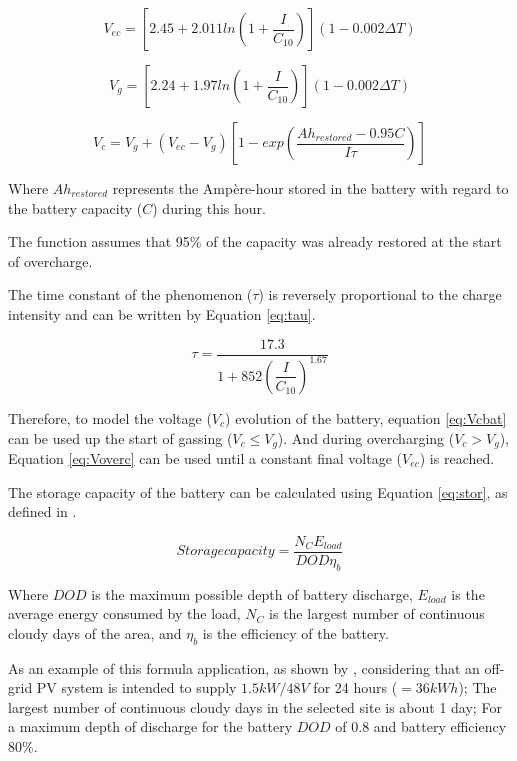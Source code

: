 \begin{equation}
\label{eq:Vec}
V_{ec} = \left[ 2.45 + 2.011 ln \left( 1+\dfrac{I}{C_{10}} \right)  \right] (1-0.002 \Delta T)
\end{equation}

\begin{equation}
\label{eq:Vg}
V_{g} = \left[ 2.24 + 1.97 ln \left( 1+\dfrac{I}{C_{10}} \right)  \right] (1-0.002 \Delta T)
\end{equation}

\begin{equation}
\label{eq:Voverc}
V_{c} = V_{g} + (V_{ec} - V_{g}) \left[ 1- exp \left( \dfrac{Ah_{restored}-0.95C}{I\tau}  \right)    \right] 
\end{equation}

Where $ Ah_{restored} $ represents the Ampère-hour stored in the battery with regard to the battery capacity ($ C $) during this hour.

The function assumes that 95\% of the capacity was already restored at the start of overcharge.

The time constant of the phenomenon ($ \tau $) is reversely proportional to the charge intensity and can be written by Equation \ref{eq:tau}.

\begin{equation}
\label{eq:tau}
\tau = \dfrac{17.3}{1+852 \left( \dfrac{I}{C_{10}} \right) ^{1.67} }
\end{equation}

Therefore, to model the voltage ($ V_{c} $) evolution of the battery, equation \ref{eq:Vcbat} can be used up the start of gassing ($ V_{c} \leq V_{g} $). And during overcharging ($ V_{c} > V_{g} $), Equation \ref{eq:Voverc} can be used until a constant final voltage ($ V_{ec} $) is reached.

The storage capacity of the battery can be calculated using Equation \ref{eq:stor}, as defined in \cite{Wenham}.

\begin{equation}
\label{eq:stor}
Storage capacity = \dfrac{N_{C}E_{load}}{DOD \eta _{b}}
\end{equation}

Where $ DOD $ is the maximum possible depth of battery discharge, $ E_{load} $ is the average energy consumed by the load, $ N_{C} $ is the largest number of continuous cloudy days of the area, and $ \eta_{b} $ is the efficiency of the battery.

As an example of this formula application, as shown by \cite{Abdulateef}, considering that an off-grid PV system is intended to supply $1.5 kW/48 V$ for 24 hours ($=36 kWh$); The largest number of continuous cloudy days in the selected site is about 1 day; For a maximum depth of discharge for the battery $DOD$ of $0.8$ and battery efficiency $80\%$.

